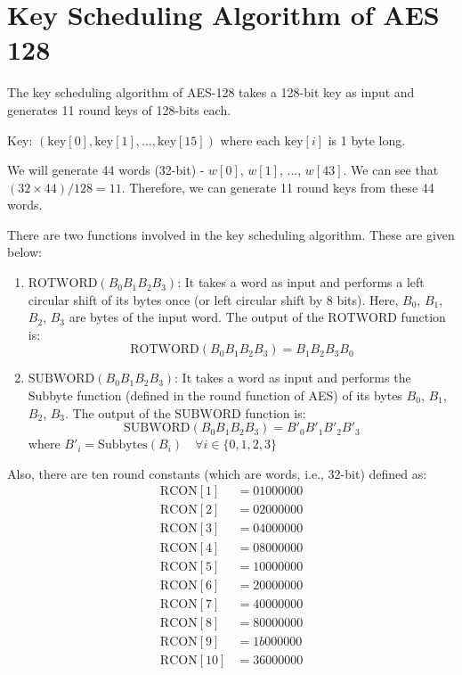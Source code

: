 \documentclass[11pt]{article}
\begin{document}
\section*{Key Scheduling Algorithm of AES 128}
The key scheduling algorithm of AES-128 takes a 128-bit key as input and generates 11 round keys of 128-bits each.

Key: $(\text{key}[0], \text{key}[1], ..., \text{key}[15])$ where each $\text{key}[i]$ is 1 byte long.

We will generate 44 words (32-bit) - $w[0]$, $w[1]$, ..., $w[43]$. We can see that $(32 \times 44)/128 = 11$. Therefore, we can generate 11 round keys from these 44 words.

There are two functions involved in the key scheduling algorithm. These are given below:

\begin{enumerate}
    \item $\text{ROTWORD}(B_0B_1B_2B_3)$: It takes a word as input and performs a left circular shift of its bytes once (or left circular shift by 8 bits). Here, $B_0$, $B_1$, $B_2$, $B_3$ are bytes of the input word. The output of the $\text{ROTWORD}$ function is:
    \[ \text{ROTWORD}(B_0B_1B_2B_3) = B_1B_2B_3B_0 \]
    
    \item $\text{SUBWORD}(B_0B_1B_2B_3)$: It takes a word as input and performs the Subbyte function (defined in the round function of AES) of its bytes $B_0$, $B_1$, $B_2$, $B_3$. The output of the $\text{SUBWORD}$ function is:
    \[ \text{SUBWORD}(B_0B_1B_2B_3) = B'_0B'_1B'_2B'_3 \]
    where $B'_i = \text{Subbytes}(B_i) \quad \forall i \in \{0, 1, 2, 3\}$
\end{enumerate}

Also, there are ten round constants (which are words, i.e., 32-bit) defined as:
\begin{align*}
    \text{RCON}[1] &= 01000000 \\
    \text{RCON}[2] &= 02000000 \\
    \text{RCON}[3] &= 04000000 \\
    \text{RCON}[4] &= 08000000 \\
    \text{RCON}[5] &= 10000000 \\
    \text{RCON}[6] &= 20000000 \\
    \text{RCON}[7] &= 40000000 \\
    \text{RCON}[8] &= 80000000 \\
    \text{RCON}[9] &= 1b000000 \\
    \text{RCON}[10] &= 36000000
\end{align*}
\end{document}
